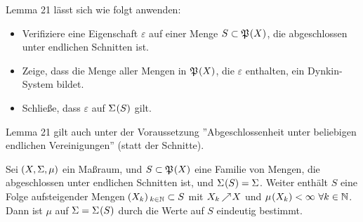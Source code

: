 \documentclass[skript.tex]{\mf{P}s}
\begin{document}
	\begin{bem}
		\textup{Lemma 21} lässt sich wie folgt anwenden:
		\begin{itemize}
			\item Verifiziere eine Eigenschaft $\varepsilon$ auf einer Menge $S\sbs \mf{P}\pr{X}$, die abgeschlossen unter endlichen Schnitten ist.
			\item Zeige, dass die Menge aller Mengen in $\mf{P}\pr{X}$, die $\varepsilon$ enthalten, ein Dynkin-System bildet.
			\item Schließe, dass $\varepsilon$ auf $\Sigma\pr{S}$ gilt. 
		\end{itemize}
	\textup{Lemma 21} gilt auch unter der Voraussetzung ''Abgeschlossenheit unter beliebigen endlichen Vereinigungen'' (statt der Schnitte).
	\end{bem}
	
	\begin{theorem}
		Sei $\pr{X,\Sigma, \mu}$ ein Maßraum, und $S\sbs \mf{P}\pr{X}$ eine Familie von Mengen, die abgeschlossen unter endlichen Schnitten ist, und $\Sigma\pr{S}=\Sigma$. Weiter enthält $S$ eine Folge aufsteigender Mengen $\pr{X_k}_{k\in\N} \sbs S$ mit $X_k\kern -1pt \nearrow \kern -2pt X$ und $\mu\pr{X_k} < \infty\ \forall k\in\N$. Dann ist $\mu$ auf $\Sigma=\Sigma\pr{S}$ durch die Werte auf $S$ eindeutig bestimmt. 
	\end{theorem}
\end{document}
